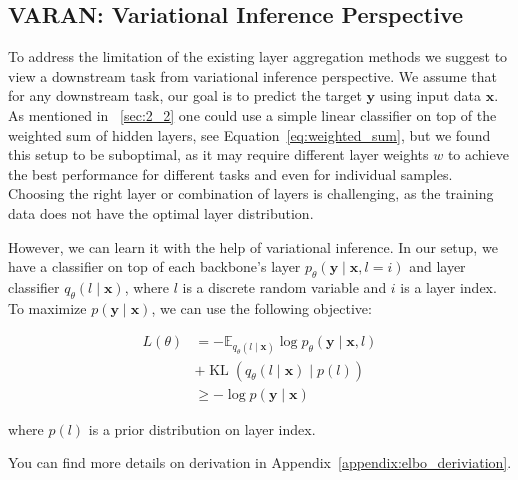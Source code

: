 \subsection{VARAN: Variational Inference Perspective}
To address the limitation of the existing layer aggregation methods we suggest to view a downstream task from variational inference perspective. We assume that for any downstream task, our goal is to predict the target $\boldsymbol{y}$ using input data $\boldsymbol{x}$. As mentioned in ~\ref{sec:2_2} one could use a simple linear classifier on top of the weighted sum of hidden layers, see Equation~\ref{eq:weighted_sum}, but we found this setup to be suboptimal, as it may require different layer weights $w$ to achieve the best performance for different tasks and even for individual samples. Choosing the right layer or combination of layers is challenging, as the training data does not have the optimal layer distribution.

However, we can learn it with the help of variational inference. In our setup, we have a classifier on top of each backbone's layer $p_\theta(\boldsymbol{y}\mid \boldsymbol{x}, l=i)$ and layer classifier $q_\theta(l \mid \boldsymbol{x})$, where $l$ is a discrete random variable and $i$ is a layer index. To maximize $p(\boldsymbol{y}\mid \boldsymbol{x})$, we can use the following objective:


\begin{align}
\label{eq:training_objective_vi}
L(\theta) &= - \mathbb{E}_{q_\theta(l \mid \boldsymbol{x})} \log p_\theta(\boldsymbol{y}\mid \boldsymbol{x}, l) \nonumber \\
&+ \operatorname{KL} \left(q_\theta(l\mid \boldsymbol{x}) \mid p(l)\right) 
\nonumber \\
&\geq - \log p(\boldsymbol{y}\mid \boldsymbol{x})
\end{align}

where $p(l)$ is a prior distribution on layer index. 

You can find more details on derivation in Appendix~\ref{appendix:elbo_deriviation}.

